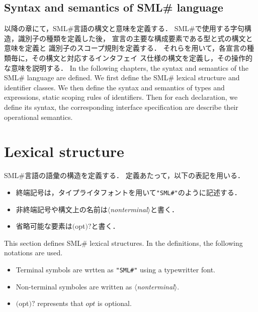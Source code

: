 \documentclass{jbook}
\newcommand{\txt}[2]{#2}
\newcommand{\smlsharp}{SML\#}
\newcommand{\nonterm}[1]{\mbox{$\langle$}{\it #1}\mbox{$\rangle$}}
\newcommand{\term}[1]{\mbox{{\tt #1}}}
\newcommand{\optional}[1]{\mbox{$($}{\protect #1}\mbox{$)?$}}
\begin{document}
\section{\txt{\smlsharp{}言語の構文と意味の定義}{Syntax and semantics of \smlsharp{} language}}

\ifjp%
	以降の章にて，\smlsharp{}言語の構文と意味を定義する．
	\smlsharp{}で使用する字句構造，識別子の種類を定義した後，
宣言の主要な構成要素である型と式の構文と意味を定義と
識別子のスコープ規則を定義する．
	それらを用いて，各宣言の種類毎に，その構文と対応するインタフェイ
ス仕様の構文を定義し，その操作的な意味を説明する．
\else%
	In the following chapters, the syntax and semantics of the
\smlsharp{} language are defined.
	We first define the \smlsharp{} lexical structure and identifier classes.
	We then define the syntax and semantics of types and
expressions, static scoping rules of identifiers.
	Then for each declaration, we define its syntax, the
corresponding interface specification are describe their operational
semantics. 
\fi%

\chapter{\txt{字句構造}{Lexical structure}}
\label{sec:lex}
\ifjp%
	\smlsharp{}言語の語彙の構造を定義する．
	定義あたって，以下の表記を用いる．
\begin{itemize}
\item 終端記号は，タイプライタフォントを用いて\term{"SML\#"}のように記述する．
\item 非終端記号や構文上の名前は\nonterm{nonterminal}と書く．
\item 省略可能な要素は\optional{opt}と書く．
\end{itemize}	
\else%
	This section defines \smlsharp{} lexical structures.
	In the definitions, the following notations are used.
\begin{itemize}
\item Terminal symbols are wrtten as \term{"SML\#"}  using a typewritter
font.
\item Non-terminal symboles are written as \nonterm{nonterminal}.
\item \optional{opt} represents that $opt$ is optional.
\end{itemize}	
\fi%
\end{document}
